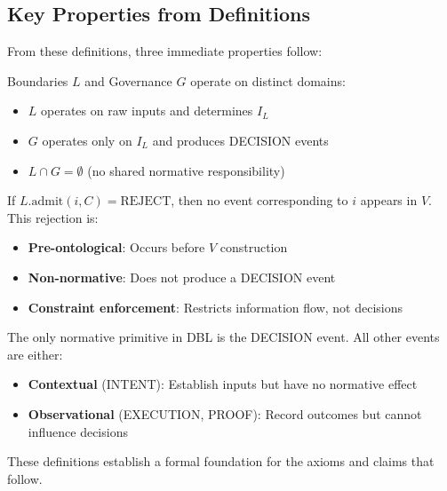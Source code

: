 \subsection{Key Properties from Definitions}

From these definitions, three immediate properties follow:

\begin{property}
Boundaries $L$ and Governance $G$ operate on distinct domains:
\begin{itemize}
  \item $L$ operates on raw inputs and determines $I_L$
  \item $G$ operates only on $I_L$ and produces DECISION events
  \item $L \cap G = \emptyset$ (no shared normative responsibility)
\end{itemize}
\end{property}

\begin{property}
If $L.\text{admit}(i, C) = \text{REJECT}$, then no event corresponding to $i$ appears in $V$. This rejection is:
\begin{itemize}
  \item \textbf{Pre-ontological}: Occurs before $V$ construction
  \item \textbf{Non-normative}: Does not produce a DECISION event
  \item \textbf{Constraint enforcement}: Restricts information flow, not decisions
\end{itemize}
\end{property}

\begin{property}
The only normative primitive in DBL is the DECISION event. All other events are either:
\begin{itemize}
  \item \textbf{Contextual} (INTENT): Establish inputs but have no normative effect
  \item \textbf{Observational} (EXECUTION, PROOF): Record outcomes but cannot influence decisions
\end{itemize}
\end{property}

These definitions establish a formal foundation for the axioms and claims that follow.
